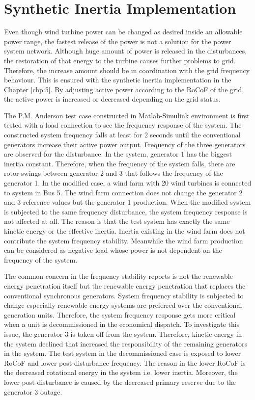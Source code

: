 \section{Synthetic Inertia Implementation}
Even though wind turbine power can be changed as desired inside an allowable power range, the fastest release of the power is not a solution for the power system network. Although huge amount of power is released in the disturbances, the restoration of that energy to the turbine causes further problems to grid. Therefore, the increase amount should be in coordination with the grid frequency behaviour. This is ensured with the synthetic inertia implementation in the Chapter \ref{chp:5}. By adjusting active power according to the RoCoF of the grid, the active power is increased or decreased depending on the grid status.\par
The P.M. Anderson test case constructed in Matlab-Simulink environment is first tested with a load connection to see the frequency response of the system. The constructed system frequency falls at least for 2 seconds until the conventional generators increase their active power output. Frequency of the three generators are observed for the disturbance. In the system, generator 1 has the biggest inertia constant. Therefore, when the frequency of the system falls, there are rotor swings between generator 2 and 3 that follows the frequency of the generator 1. In the modified case, a wind farm with 20 wind turbines is connected to system in Bus 5. The wind farm connection does not change the generator 2 and 3 reference values but the generator 1 production. When the modified system is subjected to the same frequency disturbance, the system frequency response is not affected at all. The reason is that the test system has exactly the same kinetic energy or the effective inertia. Inertia existing in the wind farm does not contribute the system frequency stability. Meanwhile the wind farm production can be considered as negative load whose power is not dependent on the frequency of the system.\par
The common concern in the frequency stability reports is not the renewable energy penetration itself but the renewable energy penetration that replaces the conventional synchronous generators. System frequency stability is subjected to change especially renewable energy systems are preferred over the conventional generation units. Therefore, the system frequency response gets more critical when a unit is decommissioned in the economical dispatch. To investigate this issue, the generator 3 is taken off from the system. Therefore, kinetic energy in the system declined that increased the responsibility of the remaining generators in the system. The test system in the decommissioned case is exposed to lower RoCoF and lower post-disturbance frequency.  The reason in the lower RoCoF is the decreased rotational energy in the system i.e. lower inertia. Moreover, the lower post-disturbance is caused by the decreased primary reserve due to the generator 3 outage.\par
